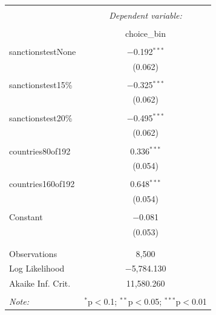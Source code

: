 \documentclass[12pt,letterpaper]{article}
\begin{document}
\begin{enumerate}
\begin{enumerate}
\begin{itemize}
				\newpage
			
		\begin{table}[!htbp] \centering 
			\caption{} 
			\label{} 
			
		
			\begin{tabular}{@{\extracolsep{5pt}}lc} 
				\\[-1.8ex]\hline 
				\hline \\[-1.8ex] 
				& \multicolumn{1}{c}{\textit{Dependent variable:}} \\ 
				\cline{2-2} 
				\\[-1.8ex] & choice\_bin \\ 
				\hline \\[-1.8ex] 
				sanctionstestNone & $-$0.192$^{***}$ \\ 
				& (0.062) \\ 
				& \\ 
				sanctionstest15\% & $-$0.325$^{***}$ \\ 
				& (0.062) \\ 
				& \\ 
				sanctionstest20\% & $-$0.495$^{***}$ \\ 
				& (0.062) \\ 
				& \\ 
				countries80of192 & 0.336$^{***}$ \\ 
				& (0.054) \\ 
				& \\ 
				countries160of192 & 0.648$^{***}$ \\ 
				& (0.054) \\ 
				& \\ 
				Constant & $-$0.081 \\ 
				& (0.053) \\ 
				& \\ 
				\hline \\[-1.8ex] 
				Observations & 8,500 \\ 
				Log Likelihood & $-$5,784.130 \\ 
				Akaike Inf. Crit. & 11,580.260 \\ 
				\hline 
				\hline \\[-1.8ex] 
				\textit{Note:}  & \multicolumn{1}{r}{$^{*}$p$<$0.1; $^{**}$p$<$0.05; $^{***}$p$<$0.01} \\ 
			\end{tabular} 
		\end{table} 
		

\end{itemize}
\end{enumerate}
\end{enumerate}
\end{document}
